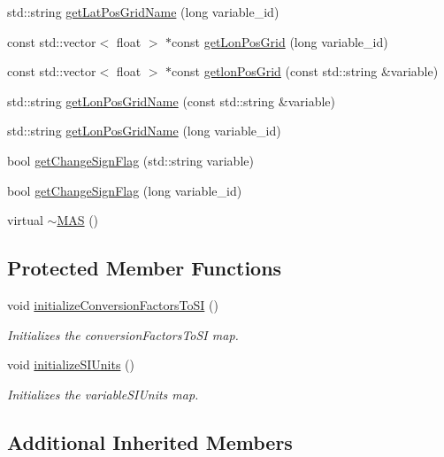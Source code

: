 \begin{DoxyCompactItemize}
std\-::string \hyperlink{classccmc_1_1_m_a_s_a2001608a37a8dfc35b4981d0397be7f0}{get\-Lat\-Pos\-Grid\-Name} (long variable\-\_\-id)
\item 
const std\-::vector$<$ float $>$ $\ast$const \hyperlink{classccmc_1_1_m_a_s_a1162c5d869616eb5085525a520897dfe}{get\-Lon\-Pos\-Grid} (long variable\-\_\-id)
\item 
const std\-::vector$<$ float $>$ $\ast$const \hyperlink{classccmc_1_1_m_a_s_aa463b73b90175dd3a4067807a5794613}{getlon\-Pos\-Grid} (const std\-::string \&variable)
\item 
std\-::string \hyperlink{classccmc_1_1_m_a_s_a00aa9361fb3997403ca55311f95689d2}{get\-Lon\-Pos\-Grid\-Name} (const std\-::string \&variable)
\item 
std\-::string \hyperlink{classccmc_1_1_m_a_s_aeaba6800251f922352e98865deba9a23}{get\-Lon\-Pos\-Grid\-Name} (long variable\-\_\-id)
\item 
bool \hyperlink{classccmc_1_1_m_a_s_a33a19b98d4e265ecbdb8eb1f0870017b}{get\-Change\-Sign\-Flag} (std\-::string variable)
\item 
bool \hyperlink{classccmc_1_1_m_a_s_a39e6ce2453ed357f6233a45ee470a02f}{get\-Change\-Sign\-Flag} (long variable\-\_\-id)
\item 
virtual \hyperlink{classccmc_1_1_m_a_s_a92b3216af9c4e6d456d1826ed0b17801}{$\sim$\-M\-A\-S} ()
\end{DoxyCompactItemize}
\subsection*{Protected Member Functions}
\begin{DoxyCompactItemize}
\item 
void \hyperlink{classccmc_1_1_m_a_s_abb1b32fcba0ca5bc7eabae7d2042e3ce}{initialize\-Conversion\-Factors\-To\-S\-I} ()
\begin{DoxyCompactList}\small\item\em Initializes the conversion\-Factors\-To\-S\-I map.  \end{DoxyCompactList}\item 
void \hyperlink{classccmc_1_1_m_a_s_a9b6c97641c9cdcacc71e706c82f0ef3d}{initialize\-S\-I\-Units} ()
\begin{DoxyCompactList}\small\item\em Initializes the variable\-S\-I\-Units map.  \end{DoxyCompactList}\end{DoxyCompactItemize}
\subsection*{Additional Inherited Members}


